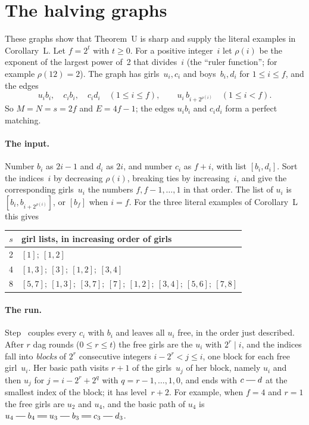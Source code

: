 \section{The halving graphs}
\label{app:halving}

These graphs show that Theorem~U is sharp and supply the literal examples
in Corollary~L. Let $f=2^t$ with $t\ge0$. For a positive integer~$i$ let
$\rho(i)$ be the exponent of the largest power of~2 that divides~$i$ (the
``ruler function''; for example $\rho(12)=2$). The graph has girls~$u_i,c_i$
and boys~$b_i,d_i$ for $1\le i\le f$, and the edges
\[
  u_ib_i,\quad c_ib_i,\quad c_id_i\quad(1\le i\le f),\qquad
  u_i\,b_{i+2^{\rho(i)}}\quad(1\le i<f).
\]
So $M=N=s=2f$ and $E=4f-1$; the edges $u_ib_i$ and $c_id_i$ form a perfect
matching.

\paragraph{The input.} Number $b_i$ as $2i-1$ and $d_i$ as $2i$, and number
$c_i$ as $f+i$, with list $[b_i,d_i]$. Sort the indices~$i$ by decreasing
$\rho(i)$, breaking ties by increasing~$i$, and give the corresponding
girls~$u_i$ the numbers $f,f-1,\ldots,1$ in that order. The list of $u_i$ is
$[b_i,b_{i+2^{\rho(i)}}]$, or $[b_f]$ when $i=f$. For the three literal
examples of Corollary~L this gives
\begin{center}\small
\begin{tabular}{cl}
\toprule
$s$&girl lists, in increasing order of girls\\
\midrule
2&$[1];\ [1,2]$\\
4&$[1,3];\ [3];\ [1,2];\ [3,4]$\\
8&$[5,7];\ [1,3];\ [3,7];\ [7];\ [1,2];\ [3,4];\ [5,6];\ [7,8]$\\
\bottomrule
\end{tabular}
\end{center}

\paragraph{The run.} Step~ couples every $c_i$ with $b_i$ and leaves all
$u_i$ free, in the order just described. After $r$ dag rounds
($0\le r\le t$) the free girls are the $u_i$ with $2^r\mid i$, and the
indices fall into \emph{blocks} of $2^r$ consecutive integers
$i-2^r<j\le i$, one block for each free girl~$u_i$. Her basic path visits
$r+1$ of the girls~$u_j$ of her block, namely $u_i$ and then $u_j$ for
$j=i-2^r+2^q$ with $q=r-1,\ldots,1,0$, and ends with $c\sg d$ at the
smallest index of the block; it has level~$r+2$. For example, when $f=4$
and $r=1$ the free girls are $u_2$ and $u_4$, and the basic path of $u_4$
is $u_4\sg b_4\db u_3\sg b_3\db c_3\sg d_3$.

